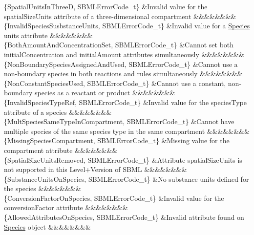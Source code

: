 \begin{DoxyParagraph}{}
\begin{longtabu}
\{Spatial\+Units\+In\+ThreeD, S\+B\+M\+L\+Error\+Code\+\_\+t\} &Invalid value for the \textquotesingle{}spatial\+Size\+Units\textquotesingle{} attribute of a three-\/dimensional compartment &&&&&&&&\\
\{Invalid\+Species\+Susbstance\+Units, S\+B\+M\+L\+Error\+Code\+\_\+t\} &Invalid value for a \hyperlink{class_species}{Species} \textquotesingle{}units\textquotesingle{} attribute &&&&&&&&\\
\{Both\+Amount\+And\+Concentration\+Set, S\+B\+M\+L\+Error\+Code\+\_\+t\} &Cannot set both \textquotesingle{}initial\+Concentration\textquotesingle{} and \textquotesingle{}initial\+Amount\textquotesingle{} attributes simultaneously &&&&&&&&\\
\{Non\+Boundary\+Species\+Assigned\+And\+Used, S\+B\+M\+L\+Error\+Code\+\_\+t\} &Cannot use a non-\/boundary species in both reactions and rules simultaneously &&&&&&&&\\
\{Non\+Constant\+Species\+Used, S\+B\+M\+L\+Error\+Code\+\_\+t\} &Cannot use a constant, non-\/boundary species as a reactant or product &&&&&&&&\\
\{Invalid\+Species\+Type\+Ref, S\+B\+M\+L\+Error\+Code\+\_\+t\} &Invalid value for the \textquotesingle{}species\+Type\textquotesingle{} attribute of a species &&&&&&&&\\
\{Mult\+Species\+Same\+Type\+In\+Compartment, S\+B\+M\+L\+Error\+Code\+\_\+t\} &Cannot have multiple species of the same species type in the same compartment &&&&&&&&\\
\{Missing\+Species\+Compartment, S\+B\+M\+L\+Error\+Code\+\_\+t\} &Missing value for the \textquotesingle{}compartment\textquotesingle{} attribute &&&&&&&&\\
\{Spatial\+Size\+Units\+Removed, S\+B\+M\+L\+Error\+Code\+\_\+t\} &Attribute \textquotesingle{}spatial\+Size\+Units\textquotesingle{} is not supported in this Level+\+Version of S\+B\+ML &&&&&&&&\\
\{Substance\+Units\+On\+Species, S\+B\+M\+L\+Error\+Code\+\_\+t\} &No substance units defined for the species &&&&&&&&\\
\{Conversion\+Factor\+On\+Species, S\+B\+M\+L\+Error\+Code\+\_\+t\} &Invalid value for the \textquotesingle{}conversion\+Factor\textquotesingle{} attribute &&&&&&&&\\
\{Allowed\+Attributes\+On\+Species, S\+B\+M\+L\+Error\+Code\+\_\+t\} &Invalid attribute found on \hyperlink{class_species}{Species} object &&&&&&&&\\

\end{longtabu}
\end{DoxyParagraph}
